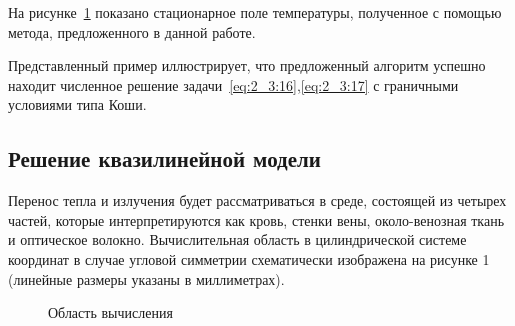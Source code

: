 \begin{figure}[ht]
    \label{fig:2_3:2}
    \caption{}
\end{figure}
На рисунке~\ref{fig:2_3:2} показано стационарное поле температуры,
полученное с помощью метода, предложенного в данной работе.

Представленный пример иллюстрирует, что предложенный
алгоритм успешно находит численное решение
задачи~\eqref{eq:2_3:16},\eqref{eq:2_3:17} с граничными
условиями типа Коши.



\subsection{Решение квазилинейной модели}
\label{subsec:ch4/sec3/quasilinear}
Перенос тепла и излучения будет рассматриваться в среде,
состоящей из четырех частей, которые интерпретируются как кровь,
стенки вены, около-венозная ткань и оптическое волокно.
Вычислительная область в цилиндрической системе координат в случае
угловой симметрии схематически изображена на рисунке 1
(линейные размеры указаны в миллиметрах).

\begin{figure}[ht]
    \caption{Область вычисления}\label{fig:4_3:3}
\end{figure}

